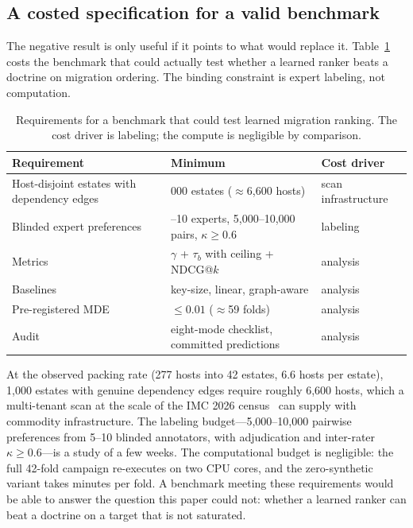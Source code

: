 \documentclass[conference,10pt]{IEEEtran}
\newcommand{\tb}{\tau_b}
\begin{document}
\subsection{A costed specification for a valid benchmark}
\label{sec:spec}

The negative result is only useful if it points to what would replace it. Table~\ref{tab:spec}
costs the benchmark that could actually test whether a learned ranker beats a doctrine on
migration ordering. The binding constraint is expert labeling, not computation.

\begin{table}[t]
\centering
\caption{Requirements for a benchmark that could test learned migration ranking. The cost driver
is labeling; the compute is negligible by comparison.}
\label{tab:spec}
\footnotesize
\begin{tabular}{@{}>{\raggedright\arraybackslash}p{2.2cm}>{\raggedright\arraybackslash}p{3.0cm}>{\raggedright\arraybackslash}p{2.4cm}@{}}
\toprule
Requirement & Minimum & Cost driver \\
\midrule
Host-disjoint estates with dependency edges & 1{,}000 estates ($\approx$6{,}600 hosts) & scan infrastructure \\
Blinded expert preferences & 5--10 experts, 5{,}000--10{,}000 pairs, $\kappa\ge0.6$ & labeling \\
Metrics & $\gamma$ + $\tb$ with ceiling + NDCG@$k$ & analysis \\
Baselines & key-size, linear, graph-aware & analysis \\
Pre-registered MDE & $\le0.01$ ($\approx$59 folds) & analysis \\
Audit & eight-mode checklist, committed predictions & analysis \\
\bottomrule
\end{tabular}
\end{table}

At the observed packing rate (277 hosts into 42 estates, 6.6 hosts per estate), 1{,}000 estates
with genuine dependency edges require roughly 6{,}600 hosts, which a multi-tenant scan at the
scale of the IMC 2026 census~\cite{mindthegap2026} can supply with commodity infrastructure. The
labeling budget---5{,}000--10{,}000 pairwise preferences from 5--10 blinded annotators, with
adjudication and inter-rater $\kappa\ge0.6$---is a study of a few weeks. The computational budget
is negligible: the full 42-fold campaign re-executes on two CPU cores, and the zero-synthetic
variant takes minutes per fold. A benchmark meeting these requirements would be able to answer
the question this paper could not: whether a learned ranker can beat a doctrine on a target that
is not saturated.
\end{document}
